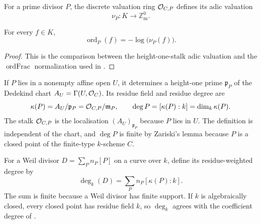 \begin{definition}
  \label{def:adelic_pointValuation}
  \leanok

  For a prime divisor \(P\), the discrete valuation ring
  \(\mathcal{O}_{C,P}\) defines its adic valuation
  \[
    \nu_P\colon K\longrightarrow\mathbb Z_{\mathrm m}^{0}.
  \]
\end{definition}

\begin{lemma}
  \label{lem:adelic_order_eq_neg_log_pointValuation}
  \leanok

  For every \(f\in K\),
  \[
    \operatorname{ord}_P(f)=-\log\bigl(\nu_P(f)\bigr).
  \]
\end{lemma}
\begin{proof}
  \leanok
  This is the comparison between the height-one-stalk adic valuation and the
  \(\operatorname{ordFrac}\) normalization used in
  .
\end{proof}

\begin{definition}
  \label{def:adelic_residue_degree}

  If \(P\) lies in a nonempty affine open \(U\), it determines a height-one
  prime \(\mathfrak p_P\) of the Dedekind chart
  \(A_U=\Gamma(U,\mathcal{O}_{C})\).  Its residue field and residue degree are
  \[
    \kappa(P)=A_U/\mathfrak p_P
      =\mathcal{O}_{C,P}/\mathfrak m_P,
    \qquad
    \deg P=[\kappa(P):k]=\dim_k\kappa(P).
  \]
  The stalk \(\mathcal{O}_{C, P}\) is the localisation \((A_U)_{\mathfrak p_P}\)
  because \(P\) lies in \(U\).  The definition is independent of the chart,
  and \(\deg P\) is finite by Zariski's lemma because \(P\) is a closed point
  of the finite-type \(k\)-scheme \(C\).
\end{definition}

\begin{definition}
  \label{def:adelic_divisor_degree}

  For a Weil divisor \(D=\sum_P n_P[P]\) on a curve over \(k\), define its
  residue-weighted degree by
  \[
    \deg_k(D)=\sum_P n_P[\kappa(P):k].
  \]
  The sum is finite because a Weil divisor has finite support.  If \(k\) is
  algebraically closed, every closed point has residue field \(k\), so
  \(\deg_k\) agrees with the coefficient degree of
  .
\end{definition}

